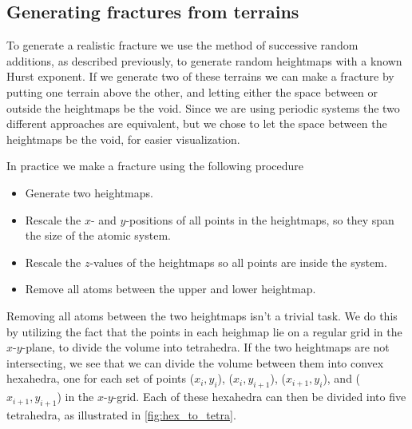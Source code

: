 \subsection{Generating fractures from terrains}
To generate a realistic fracture we use the method of successive random additions, as described previously, to generate random heightmaps with a known Hurst exponent. If we generate two of these terrains we can make a fracture by putting one terrain above the other, and letting either the space between or outside the heightmaps be the void. Since we are using periodic systems the two different approaches are equivalent, but we chose to let the space between the heightmaps be the void, for easier visualization.

In practice we make a fracture using the following procedure
\begin{itemize}
    \item Generate two heightmaps.
    \item Rescale the $x$- and $y$-positions of all points in the heightmaps, so they span the size of the atomic system.
    \item Rescale the $z$-values of the heightmaps so all points are inside the system.
    \item Remove all atoms between the upper and lower heightmap.
\end{itemize}

Removing all atoms between the two heightmaps isn't a trivial task. We do this by utilizing the fact that the points in each heighmap lie on a regular grid in the $x$-$y$-plane, to divide the volume into tetrahedra. If the two heightmaps are not intersecting, we see that we can divide the volume between them into convex hexahedra, one for each set of points
($x_{i}, y_{i}$), ($x_{i}, y_{i+1}$), ($x_{i+1}, y_{i}$), and ($x_{i+1}, y_{i+1}$) 
in the $x$-$y$-grid. Each of these hexahedra can then be divided into five tetrahedra, as illustrated in \cref{fig:hex_to_tetra}.

% 

